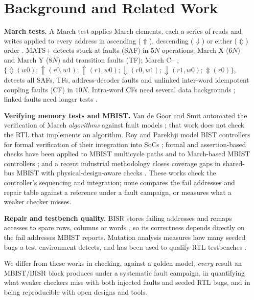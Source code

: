 \documentclass[conference]{IEEEtran}
\begin{document}
\section{Background and Related Work}
\label{sec:background}
\textbf{March tests.} A March test applies March elements, each a series of reads and writes
applied to every address in ascending ($\Uparrow$), descending ($\Downarrow$) or either
($\Updownarrow$) order \cite{vandegoor1991,vandegoor1993}. MATS+ \cite{knaizuk1977,vandegoor1991}
detects stuck-at faults (SAF) in $5N$ operations; March X ($6N$) and March Y ($8N$) add
transition faults (TF); March C-- \cite{marinescu1982,vandegoor1993},
$\{\Updownarrow(w0);\Uparrow(r0,w1);\Uparrow(r1,w0);\Downarrow(r0,w1);\Downarrow(r1,w0);\Updownarrow(r0)\}$,
detects all SAFs, TFs, address-decoder faults and unlinked inter-word idempotent coupling faults
(CF) in $10N$. Intra-word CFs need several data backgrounds \cite{vandegoor1991}; linked faults
need longer tests \cite{vandegoor1996,alharbi2003}.

\textbf{Verifying memory tests and MBIST.} Van de Goor and Smit automated the verification of
March \emph{algorithms} against fault models \cite{vandegoor1994}; that work does not check the RTL
that implements an algorithm. Roy and Parekhji model BIST controllers for formal verification of
their integration into SoCs \cite{roy2007}; formal and assertion-based checks have been applied to
MBIST multicycle paths \cite{daga2015} and to March-based MBIST controllers \cite{kumar2021}; and a
recent industrial methodology closes coverage gaps in shared-bus MBIST with physical-design-aware
checks \cite{tulsyan2026}. These works check the controller's sequencing and integration; none
compares the fail addresses and repair table against a reference under a fault campaign, or
measures what a weaker checker misses.

\textbf{Repair and testbench quality.} BISR stores failing addresses and remaps accesses to spare
rows, columns or words \cite{zorian2003,sontakke2024}, so its correctness depends directly on the
fail addresses MBIST reports. Mutation analysis \cite{demillo1978,jia2011} measures how many
seeded bugs a test environment detects, and has been used to qualify RTL testbenches
\cite{huang2015}.

We differ from these works in checking, against a golden model, \emph{every} result an MBIST/BISR
block produces under a systematic fault campaign, in quantifying what weaker checkers miss with
both injected faults and seeded RTL bugs, and in being reproducible with open designs and tools.
\end{document}
